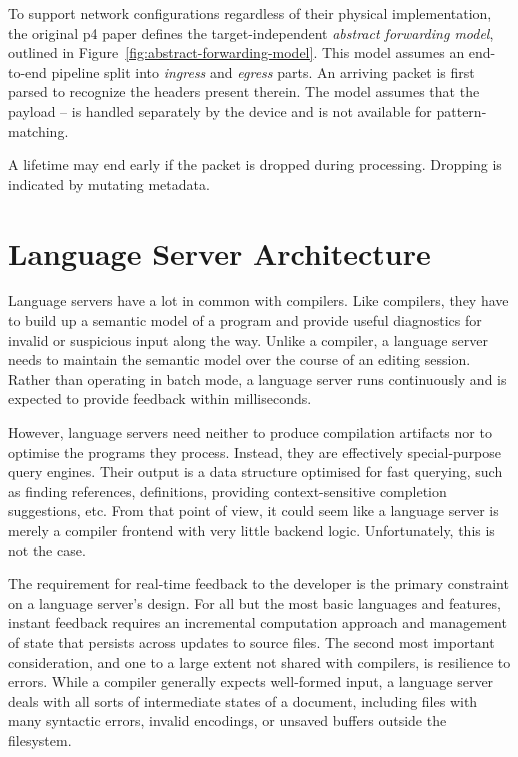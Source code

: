 To support network configurations regardless of their physical implementation,
the original \acrshort{p4} paper defines the target-independent \emph{abstract
forwarding model}, outlined in Figure~\ref{fig:abstract-forwarding-model}. This
model assumes an end-to-end pipeline split into \emph{ingress} and \emph{egress}
parts. An arriving packet is first parsed to recognize the headers present
therein. The model assumes that the payload --  is handled separately by the device
and is not available for pattern-matching.


A lifetime may end early if the packet is dropped during processing. Dropping is
indicated by mutating metadata.


\chapter{Language Server Architecture}

Language servers have a lot in common with compilers. Like compilers, they have
to build up a semantic model of a program and provide useful diagnostics for
invalid or suspicious input along the way. Unlike a compiler, a language server
needs to maintain the semantic model over the course of an editing session.
Rather than operating in batch mode, a language server runs continuously and is
expected to provide feedback within milliseconds.

However, language servers need neither to produce compilation artifacts nor to
optimise the programs they process. Instead, they are effectively
special-purpose query engines. Their output is a data structure optimised for
fast querying, such as finding references, definitions, providing
context-sensitive completion suggestions, etc. From that point of view, it could
seem like a language server is merely a compiler frontend with very little backend
logic. Unfortunately, this is not the case.

The requirement for real-time feedback to the developer is the primary
constraint on a language server's design. For all but the most basic languages
and features, instant feedback requires an incremental computation approach and
management of state that persists across updates to source files. The second
most important consideration, and one to a large extent not shared with
compilers, is resilience to errors. While a compiler generally expects
well-formed input, a language server deals with all sorts of intermediate states
of a document, including files with many syntactic errors, invalid encodings, or
unsaved buffers outside the filesystem.

